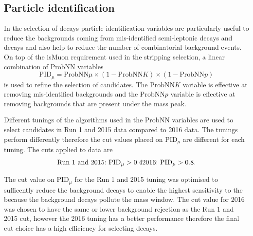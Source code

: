 


\subsection{Particle identification}
\label{sec:BFpid}

In the selection of \bmumu decays particle identification variables are particularly useful to reduce the backgrounds coming from mis-identified semi-leptonic decays and \bhh decays and also help to reduce the number of combinatorial background events. On top of the isMuon requirement used in the stripping selection, a linear combination of ProbNN variables 
\begin{equation}
\text{PID}_{\mu} = \text{ProbNN}\mu \times(1 -  \text{ProbNN}K)  \times(1 -  \text{ProbNN}p) 
\end{equation}
is used to refine the selection of \bmumu candidates. The ProbNN$K$ variable is effective at removing mis-identified \bhh backgrounds and the ProbNN$p$ variable is effective at removing \lambdab backgrounds that are present under the \bd mass peak. 

Different tunings of the algorithms used in the ProbNN variables are used to select candidates in Run 1 and 2015 data compared to 2016 data. The tunings perform differently therefore the cut values placed on PID$_{\mu}$ are different for each tuning. The cuts applied to data are
\begin{equation}
\text{Run 1 and 2015:} \text{ PID}_{\mu} > 0.4 \\
\text{2016:} \text{ PID}_{\mu} > 0.8.
\end{equation}

The cut value on PID$_{\mu}$ for the Run 1 and 2015 tuning was optimised to sufficently reduce the background decays to enable the highest sensitivity to the \bdmumu because the background decays pollute the \bd mass window. The cut value for 2016 was chosen to have the same or lower background rejection as the Run 1 and 2015 cut, however the 2016 tuning has a better performance therefore the final cut choice has a high efficiency for selecting \bmumu decays. 

